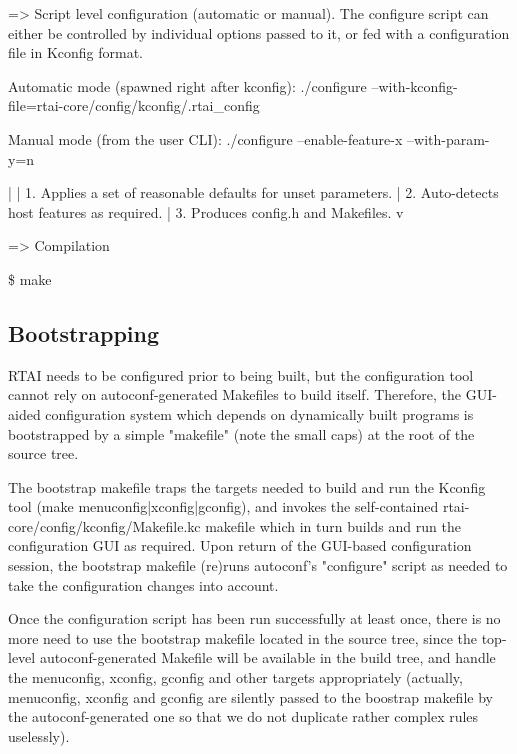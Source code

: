 => Script level configuration (automatic or manual). The configure
script can either be controlled by individual options passed to it, or
fed with a configuration file in Kconfig format.

  Automatic mode (spawned right after kconfig):
	./configure --with-kconfig-file=rtai-core/config/kconfig/.rtai\_config

  Manual mode (from the user CLI):
	./configure --enable-feature-x --with-param-y=n

         |
         | 1. Applies a set of reasonable defaults for unset parameters.
	 | 2. Auto-detects host features as required.
	 | 3. Produces config.h and Makefiles.
         v

=> Compilation

   \$ make


\subsection{Bootstrapping}

RTAI needs to be configured prior to being built, but the
configuration tool cannot rely on autoconf-generated Makefiles to
build itself. Therefore, the GUI-aided configuration system which
depends on dynamically built programs is bootstrapped by a simple
"makefile" (note the small caps) at the root of the source tree.

The bootstrap makefile traps the targets needed to build and run the
Kconfig tool (make menuconfig|xconfig|gconfig), and invokes the
self-contained rtai-core/config/kconfig/Makefile.kc makefile which in
turn builds and run the configuration GUI as required. Upon return of
the GUI-based configuration session, the bootstrap makefile (re)runs
autoconf's "configure" script as needed to take the configuration
changes into account.

Once the configuration script has been run successfully at least once,
there is no more need to use the bootstrap makefile located in the
source tree, since the top-level autoconf-generated Makefile will be
available in the build tree, and handle the menuconfig, xconfig,
gconfig and other targets appropriately (actually, menuconfig, xconfig
and gconfig are silently passed to the boostrap makefile by the
autoconf-generated one so that we do not duplicate rather complex
rules uselessly).


